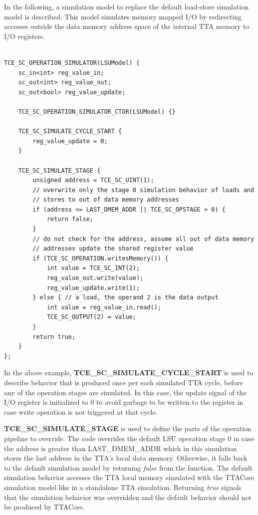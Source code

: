 \documentclass[a4paper,twoside]{tceusermanual}
\begin{document}
In the following, a simulation model to replace the default load-store
simulation model is described. This model simulates memory mapped I/O
by redirecting accesses outside the data memory address space of the
internal TTA memory to I/O registers.

\begin{verbatim}

TCE_SC_OPERATION_SIMULATOR(LSUModel) {
    sc_in<int> reg_value_in;
    sc_out<int> reg_value_out;
    sc_out<bool> reg_value_update;

    TCE_SC_OPERATION_SIMULATOR_CTOR(LSUModel) {}

    TCE_SC_SIMULATE_CYCLE_START {
        reg_value_update = 0;
    }

    TCE_SC_SIMULATE_STAGE {
        unsigned address = TCE_SC_UINT(1);
        // overwrite only the stage 0 simulation behavior of loads and 
        // stores to out of data memory addresses
        if (address <= LAST_DMEM_ADDR || TCE_SC_OPSTAGE > 0) {
            return false; 
        }
        // do not check for the address, assume all out of data memory
        // addresses update the shared register value
        if (TCE_SC_OPERATION.writesMemory()) {
            int value = TCE_SC_INT(2);
            reg_value_out.write(value);
            reg_value_update.write(1);
        } else { // a load, the operand 2 is the data output 
            int value = reg_value_in.read();
            TCE_SC_OUTPUT(2) = value;
        }
        return true;
    }
};

\end{verbatim}

In the above example, \textbf{TCE\_SC\_SIMULATE\_CYCLE\_START} is used to
describe behavior that is produced once per each simulated TTA cycle,
before any of the operation stages are simulated. In this case,
the update signal of the I/O register is initialized to 0 to avoid
garbage to be written to the register in case write operation is not
triggered at that cycle. 

\textbf{TCE\_SC\_SIMULATE\_STAGE} is used to define the parts of the operation 
pipeline to override. The code overrides the default LSU operation stage
0 in case the address is greater than LAST\_DMEM\_ADDR which in this simulation
stores the last address in the TTA's local data memory. Otherwise, it falls 
back to the default simulation model by returning \textit{false} from the 
function. The default simulation behavior accesses the TTA local memory 
simulated with the TTACore simulation model like in a standalone TTA 
simulation. Returning \textit{true} signals that the simulation behavior was 
overridden and the default behavior should not be produced by TTACore.
\end{document}
